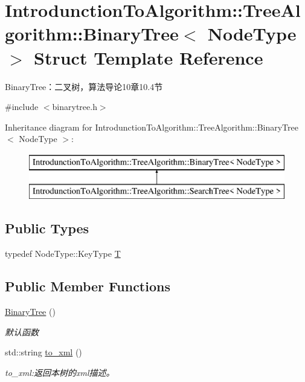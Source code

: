 \hypertarget{struct_introdunction_to_algorithm_1_1_tree_algorithm_1_1_binary_tree}{}\section{Introdunction\+To\+Algorithm\+:\+:Tree\+Algorithm\+:\+:Binary\+Tree$<$ Node\+Type $>$ Struct Template Reference}
\label{struct_introdunction_to_algorithm_1_1_tree_algorithm_1_1_binary_tree}


Binary\+Tree：二叉树，算法导论10章10.4节  




{\ttfamily \#include $<$binarytree.\+h$>$}

Inheritance diagram for Introdunction\+To\+Algorithm\+:\+:Tree\+Algorithm\+:\+:Binary\+Tree$<$ Node\+Type $>$\+:\begin{figure}[H]
\begin{center}
\leavevmode
\includegraphics[height=2.000000cm]{struct_introdunction_to_algorithm_1_1_tree_algorithm_1_1_binary_tree}
\end{center}
\end{figure}
\subsection*{Public Types}
\begin{DoxyCompactItemize}
\item 
typedef Node\+Type\+::\+Key\+Type \hyperlink{struct_introdunction_to_algorithm_1_1_tree_algorithm_1_1_binary_tree_ae2feaade7bbb1e1f436475069cb1cd20}{T}
\end{DoxyCompactItemize}
\subsection*{Public Member Functions}
\begin{DoxyCompactItemize}
\item 
\hyperlink{struct_introdunction_to_algorithm_1_1_tree_algorithm_1_1_binary_tree_a32fbf1f65e0262839aa38b8eb6744781}{Binary\+Tree} ()
\begin{DoxyCompactList}\small\item\em 默认函数 \end{DoxyCompactList}\item 
std\+::string \hyperlink{struct_introdunction_to_algorithm_1_1_tree_algorithm_1_1_binary_tree_a55874f5ca046b9f3ad1d44c2f7ff4142}{to\+\_\+xml} ()
\begin{DoxyCompactList}\small\item\em to\+\_\+xml\+:返回本树的{\ttfamily xml}描述。 \end{DoxyCompactList}\end{DoxyCompactItemize}
